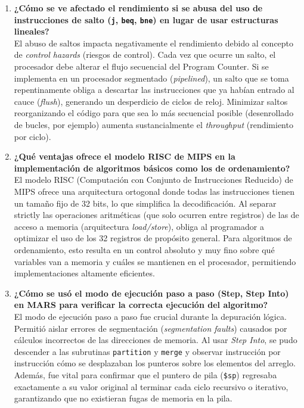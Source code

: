 \documentclass[12pt,letterpaper]{article}
\begin{document}
\begin{enumerate}[label=\textbf{\arabic*.}, leftmargin=*]
    \item \textbf{¿Cómo se ve afectado el rendimiento si se abusa del uso de instrucciones de salto (\texttt{j}, \texttt{beq}, \texttt{bne}) en lugar de usar estructuras lineales?} \\
    El abuso de saltos impacta negativamente el rendimiento debido al concepto de \textit{control hazards} (riesgos de control). Cada vez que ocurre un salto, el procesador debe alterar el flujo secuencial del Program Counter. Si se implementa en un procesador segmentado (\textit{pipelined}), un salto que se toma repentinamente obliga a descartar las instrucciones que ya habían entrado al cauce (\textit{flush}), generando un desperdicio de ciclos de reloj. Minimizar saltos reorganizando el código para que sea lo más secuencial posible (desenrollado de bucles, por ejemplo) aumenta sustancialmente el \textit{throughput} (rendimiento por ciclo).

    \item \textbf{¿Qué ventajas ofrece el modelo RISC de MIPS en la implementación de algoritmos básicos como los de ordenamiento?} \\
    El modelo RISC (Computación con Conjunto de Instrucciones Reducido) de MIPS ofrece una arquitectura ortogonal donde todas las instrucciones tienen un tamaño fijo de 32 bits, lo que simplifica la decodificación. Al separar strictly las operaciones aritméticas (que solo ocurren entre registros) de las de acceso a memoria (arquitectura \textit{load/store}), obliga al programador a optimizar el uso de los 32 registros de propósito general. Para algoritmos de ordenamiento, esto resulta en un control absoluto y muy fino sobre qué variables van a memoria y cuáles se mantienen en el procesador, permitiendo implementaciones altamente eficientes.

    \item \textbf{¿Cómo se usó el modo de ejecución paso a paso (Step, Step Into) en MARS para verificar la correcta ejecución del algoritmo?} \\
    El modo de ejecución paso a paso fue crucial durante la depuración lógica. Permitió aislar errores de segmentación (\textit{segmentation faults}) causados por cálculos incorrectos de las direcciones de memoria. Al usar \textit{Step Into}, se pudo descender a las subrutinas \texttt{partition} y \texttt{merge} y observar instrucción por instrucción cómo se desplazaban los punteros sobre los elementos del arreglo. Además, fue vital para confirmar que el puntero de pila (\texttt{\$sp}) regresaba exactamente a su valor original al terminar cada ciclo recursivo o iterativo, garantizando que no existieran fugas de memoria en la pila.


\end{enumerate}
\end{document}

